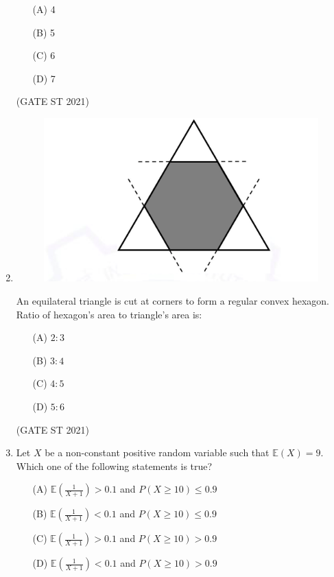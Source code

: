 \documentclass[journal,12pt,onecolumn]{IEEEtran}
\theoremstyle{remark}
\begin{document}
\begin{enumerate}
\begin{enumerate}
\item[(A)] 4
\item[(B)] 5
\item[(C)] 6
\item[(D)] 7
\end{enumerate}

\hfill (GATE ST 2021) \\

\newpage

\item 
\begin{figure}
    \centering
    \includegraphics[width=0.5\linewidth]{figs/5.png}
    \caption{}
    \label{fig:3}
\end{figure}

An equilateral triangle is cut at corners to form a regular convex hexagon.  
Ratio of hexagon's area to triangle's area is:

\begin{enumerate}
\item[(A)] $2:3$
\item[(B)] $3:4$
\item[(C)] $4:5$
\item[(D)] $5:6$
\end{enumerate}

\hfill (GATE ST 2021) \\

\item
Let $X$ be a non-constant positive random variable such that $\mathbb{E}(X) = 9$.  
Which one of the following statements is true?

\begin{enumerate}
\item[(A)] $\mathbb{E}\left( \frac{1}{X+1} \right) > 0.1$ and $P(X \geq 10) \leq 0.9$
\item[(B)] $\mathbb{E}\left( \frac{1}{X+1} \right) < 0.1$ and $P(X \geq 10) \leq 0.9$
\item[(C)] $\mathbb{E}\left( \frac{1}{X+1} \right) > 0.1$ and $P(X \geq 10) > 0.9$
\item[(D)] $\mathbb{E}\left( \frac{1}{X+1} \right) < 0.1$ and $P(X \geq 10) > 0.9$
\end{enumerate}


\end{enumerate}
\end{document}
